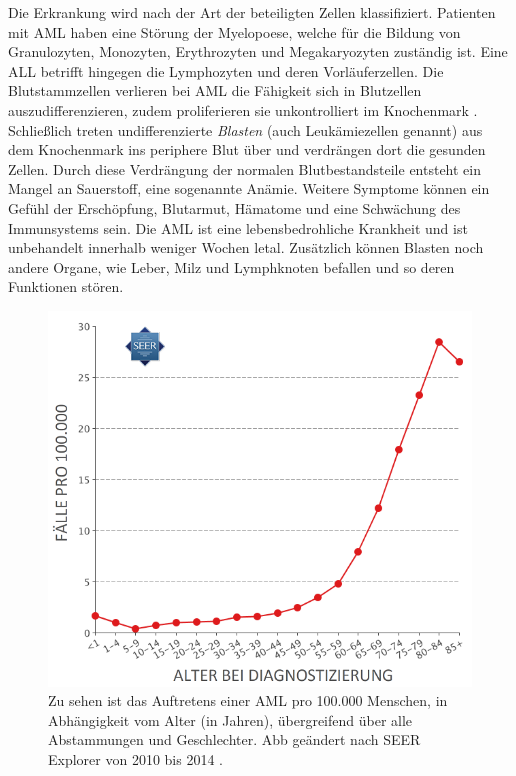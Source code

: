 Die Erkrankung wird nach der Art der beteiligten Zellen klassifiziert. Patienten mit \ac{AML} haben eine Störung der Myelopoese, welche für die Bildung von Granulozyten, Monozyten, Erythrozyten und Megakaryozyten zuständig ist. Eine \ac{ALL} betrifft hingegen die Lymphozyten und deren Vorläuferzellen. Die Blutstammzellen verlieren bei \ac{AML} die Fähigkeit sich in Blutzellen auszudifferenzieren, zudem proliferieren sie unkontrolliert im Knochenmark \cite{Papaemmanuil.2016}. Schließlich treten undifferenzierte \emph{Blasten} (auch Leukämiezellen genannt) aus dem Knochenmark ins periphere Blut über und verdrängen dort die gesunden Zellen. Durch diese Verdrängung der normalen Blutbestandsteile entsteht ein Mangel an Sauerstoff, eine sogenannte Anämie. Weitere Symptome können ein Gefühl der Erschöpfung, Blutarmut, Hämatome und eine Schwächung des Immunsystems sein. Die \ac{AML} ist eine lebensbedrohliche Krankheit und ist unbehandelt innerhalb weniger Wochen letal. Zusätzlich können Blasten noch andere Organe, wie Leber, Milz und Lymphknoten befallen und so deren Funktionen stören.

\begin{figure}
    \centering
    \includegraphics[width=.90\textwidth]{images/Alter_AML_2014.png}
    \caption{Zu sehen ist das Auftretens einer \ac{AML} pro 100.000 Menschen, in Abhängigkeit vom Alter (in Jahren), übergreifend über alle Abstammungen und Geschlechter. \ac{Abb} geändert nach SEER Explorer\protect\footnotemark{} von 2010 bis 2014 \cite{Howlader.2014}.}
    \label{fig:Alter_AML}
\end{figure}

